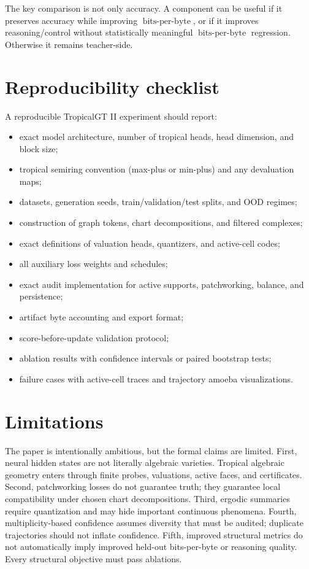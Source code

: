 \documentclass[11pt]{article}
\newcommand{\bpb}{\operatorname{bits\mbox{-}per\mbox{-}byte}}
\begin{document}
The key comparison is not only accuracy.  A component can be useful if it preserves accuracy while improving \(\bpb\), or if it improves reasoning/control without statistically meaningful \(\bpb\) regression.  Otherwise it remains teacher-side.

\section{Reproducibility checklist}

A reproducible TropicalGT II experiment should report:
\begin{itemize}
\item exact model architecture, number of tropical heads, head dimension, and block size;
\item tropical semiring convention (max-plus or min-plus) and any devaluation maps;
\item datasets, generation seeds, train/validation/test splits, and OOD regimes;
\item construction of graph tokens, chart decompositions, and filtered complexes;
\item exact definitions of valuation heads, quantizers, and active-cell codes;
\item all auxiliary loss weights and schedules;
\item exact audit implementation for active supports, patchworking, balance, and persistence;
\item artifact byte accounting and export format;
\item score-before-update validation protocol;
\item ablation results with confidence intervals or paired bootstrap tests;
\item failure cases with active-cell traces and trajectory amoeba visualizations.
\end{itemize}

\section{Limitations}

The paper is intentionally ambitious, but the formal claims are limited.  First, neural hidden states are not literally algebraic varieties.  Tropical algebraic geometry enters through finite probes, valuations, active faces, and certificates.  Second, patchworking losses do not guarantee truth; they guarantee local compatibility under chosen chart decompositions.  Third, ergodic summaries require quantization and may hide important continuous phenomena.  Fourth, multiplicity-based confidence assumes diversity that must be audited; duplicate trajectories should not inflate confidence.  Fifth, improved structural metrics do not automatically imply improved held-out bits-per-byte or reasoning quality.  Every structural objective must pass ablations.
\end{document}
